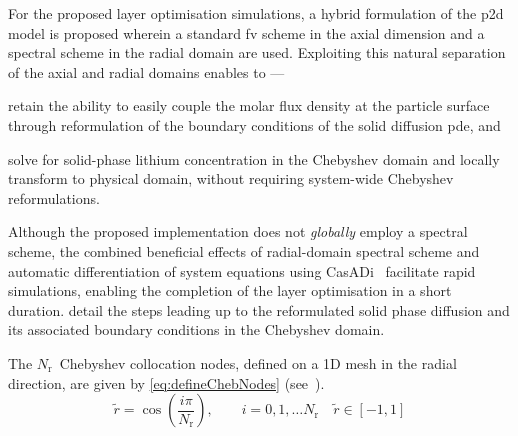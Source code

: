     For the proposed layer optimisation simulations, a hybrid formulation of the
    \gls{p2d} model is proposed wherein a  standard \gls{fv} scheme in the axial
    dimension and  a spectral scheme in  the radial domain are  used. Exploiting
    this natural separation of the axial and radial domains enables to ---
    \begin{enumerate*}[label=\roman*)]
        \item retain  the   ability  to  easily   couple  the   molar  flux  density   at  the particle  surface  through  reformulation  of the  boundary  conditions  of  the solid  diffusion \gls{pde},  and
        \item solve  for  solid-phase  lithium  concentration  in  the  Chebyshev  domain  and locally transform  to physical  domain, without requiring  system-wide Chebyshev reformulations.
    \end{enumerate*}
    Although  the  proposed  implementation   does  not  \emph{globally}  employ
    a  spectral  scheme,  the   combined  beneficial  effects  of  radial-domain
    spectral   scheme  and   automatic  differentiation   of  system   equations
    using  CasADi~\cite{Andersson2013b} facilitate  rapid simulations,  enabling
    the   completion  of   the   layer  optimisation   in   a  short   duration.
      detail  the  steps
    leading  up to  the reformulated  solid phase  diffusion and  its associated
    boundary conditions in the Chebyshev domain.

    The  $N_\text{r}$~Chebyshev   collocation  nodes,  defined  on   a  1D  mesh
    in   the   radial   direction,  are   given   by   \cref{eq:defineChebNodes}
    (see~\cite{Trefethen2000}).
    \begin{equation}\label{eq:defineChebNodes}
        \widetilde{r} = \cos\left(\frac{i\pi}{N_\text{r}}\right), \qquad i = 0, 1, \dots N_\text{r} \quad \widetilde{r} \in [-1, 1]
    \end{equation}

